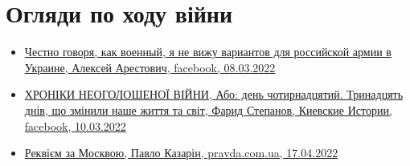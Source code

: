  
 
 
 
 
\section{Огляди по ходу війни}
\label{sec:topics.vojna.ogljady}

\begin{itemize} %
\item \hyperlink{08_03_2022.fb.arestovich_alexei.1.varianty}{%
Честно говоря, как военный, я не вижу вариантов для российской армии в Украине, Алексей Арестович, %
facebook, 08.03.2022%
}

\item \hyperlink{10_03_2022.fb.fb_group.story_kiev_ua.1.hroniki}{%
ХРОНІКИ НЕОГОЛОШЕНОЇ ВІЙНИ, Або: день чотирнадцятий. Тринадцять днів, що змінили наше життя та світ, %
Фарид Степанов, Киевские Истории, facebook, 10.03.2022%
}

\item \hyperlink{17_04_2022.stz.news.ua.pravda.1.rekviem_za_moskvoju}{%
Реквієм за Москвою, Павло Казарін, pravda.com.ua, 17.04.2022%
}

\end{itemize} %
